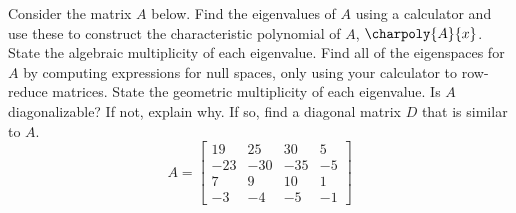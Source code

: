 Consider the matrix $A$ below.  Find the eigenvalues of $A$ using a calculator and use these to construct the characteristic polynomial of $A$, $\charpoly{A}{x}$.  State the algebraic multiplicity of each eigenvalue. Find all of the eigenspaces for $A$ by computing expressions for null spaces, only using your calculator to row-reduce matrices.  State the geometric multiplicity of each eigenvalue.  Is $A$ diagonalizable?  If not, explain why.  If so, find a diagonal matrix $D$ that is similar to $A$.
%
\begin{equation*}
A=
\begin{bmatrix}
 19 & 25 & 30 & 5 \\
 -23 & -30 & -35 & -5 \\
 7 & 9 & 10 & 1 \\
 -3 & -4 & -5 & -1
\end{bmatrix}
\end{equation*}
